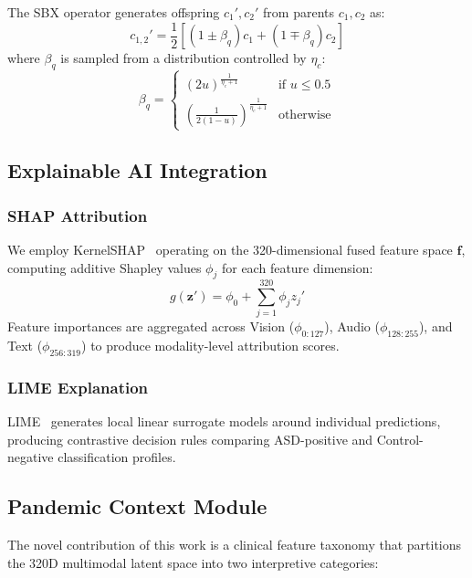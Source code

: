 \documentclass[conference]{IEEEtran}
\begin{document}
The SBX operator generates offspring $c_1', c_2'$ from parents $c_1, c_2$ as:
\begin{equation}
    c_{1,2}' = \frac{1}{2}\left[(1 \pm \beta_q) c_1 + (1 \mp \beta_q) c_2\right]
\end{equation}
where $\beta_q$ is sampled from a distribution controlled by $\eta_c$:
\begin{equation}
    \beta_q = \begin{cases}
    (2u)^{\frac{1}{\eta_c + 1}} & \text{if } u \leq 0.5 \\
    \left(\frac{1}{2(1-u)}\right)^{\frac{1}{\eta_c + 1}} & \text{otherwise}
    \end{cases}
\end{equation}

\subsection{Explainable AI Integration}
\label{sec:xai}

\subsubsection{SHAP Attribution}
We employ KernelSHAP~\cite{lundberg2017shap} operating on the 320-dimensional fused feature space $\mathbf{f}$, computing additive Shapley values $\phi_j$ for each feature dimension:
\begin{equation}
    g(\mathbf{z}') = \phi_0 + \sum_{j=1}^{320} \phi_j z_j'
\end{equation}
Feature importances are aggregated across Vision ($\phi_{0:127}$), Audio ($\phi_{128:255}$), and Text ($\phi_{256:319}$) to produce modality-level attribution scores.

\subsubsection{LIME Explanation}
LIME~\cite{ribeiro2016lime} generates local linear surrogate models around individual predictions, producing contrastive decision rules comparing ASD-positive and Control-negative classification profiles.

\subsection{Pandemic Context Module}
\label{sec:pandemic}

The novel contribution of this work is a clinical feature taxonomy that partitions the 320D multimodal latent space into two interpretive categories:
\end{document}
